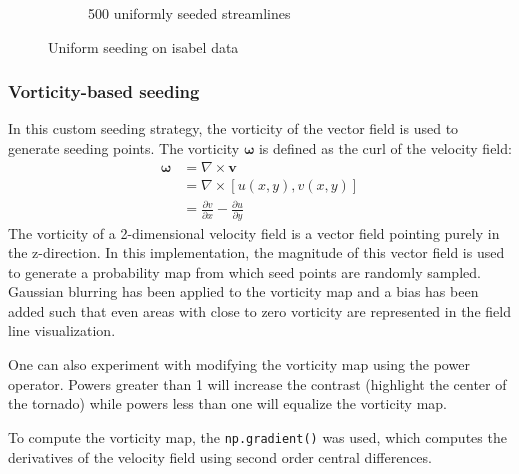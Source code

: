 \documentclass{article}
\begin{document}
\begin{figure}[h!]
\begin{subfigure}{0.6\textwidth}
        \caption{500 uniformly seeded streamlines}
    \end{subfigure}
    \caption{Uniform seeding on isabel data}
\end{figure}


\subsubsection{Vorticity-based seeding}
In this custom seeding strategy, the vorticity of the vector field is used
to generate seeding points. The vorticity $\mathbf{\omega}$ is defined as the curl of the velocity field:
\begin{align*}
    \mathbf{\omega} &= \nabla \times \mathbf{v} \\
    &= \nabla \times \left[u(x, y), v(x, y)\right] \\
    &= \frac{\partial v}{\partial x} - \frac{\partial u}{ \partial y}
\end{align*}
The vorticity of a 2-dimensional velocity field is a vector field pointing purely in the z-direction. In this implementation, 
the magnitude of this vector field is used to generate a probability map from which seed points are randomly sampled.
Gaussian blurring has been applied to the vorticity map and a bias has been added such that even areas with close to zero vorticity are 
represented in the field line visualization.

One can also experiment with modifying the vorticity map using the power operator. Powers greater than 1 will increase the contrast
(highlight the center of the tornado) while powers less than one will equalize the vorticity map.

To compute the vorticity map, the \verb|np.gradient()| was used, which computes the derivatives of the velocity field
using second order central differences.
\end{document}
